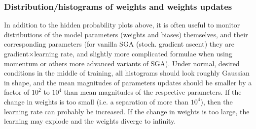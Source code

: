 \subsubsection{Distribution/histograms of weights and weights updates}
In addition to the hidden probability plots above, it is often useful to monitor distributions of the model parameters (weights and biases) themselves, and their corresponding parameters  (for vanilla SGA (stoch. gradient ascent) they are gradient$\times$learning rate, and slightly more complicated formulae when using momentum or others more advanced variants of SGA). Under normal, desired conditions in the middle of
training, all histograms should look roughly Gaussian in shape, and the mean magnitudes of parameters updates should be smaller by a factor of $10^2$ to $10^4$ than mean magnitudes of the respective parameters. If the change in weights is too small (i.e. a separation of more than
$10^4$), then the learning rate can probably be increased. If the change in weights is too large, the learning may explode and the weights diverge to infinity.

